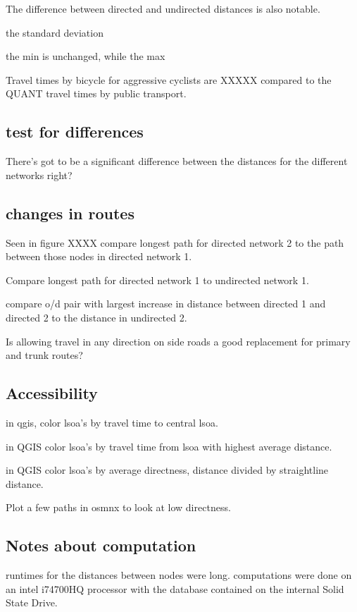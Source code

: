 \documentclass[11pt]{article} %
\begin{document}
The difference between directed and undirected distances is also notable. 

the standard deviation 

the min is unchanged, while the max 

Travel times by bicycle for aggressive cyclists are XXXXX compared to the QUANT travel times by public transport. 

\subsection{test for differences}

There's got to be a significant difference between the distances for the different networks right?

\subsection{changes in routes}

Seen in figure XXXX  compare longest path for directed network 2 to the path between those nodes in directed network 1. 

Compare longest path for directed network 1 to undirected network 1. 

compare o/d pair with largest increase in distance between directed 1 and directed 2 to the distance in undirected 2. 

Is allowing travel in any direction on side roads a good replacement for primary and trunk routes?

\subsection{Accessibility} 

in qgis, color lsoa's by travel time to central lsoa. 

in QGIS color lsoa's by travel time from lsoa with highest average distance. 

in QGIS color lsoa's by  average directness, distance divided by straightline distance. 

Plot a few paths in osmnx to look at low directness. 

\subsection{Notes about computation}

runtimes for the distances between nodes were long. computations were done on an intel i74700HQ processor with the database contained on the internal Solid State Drive. 
\end{document}
